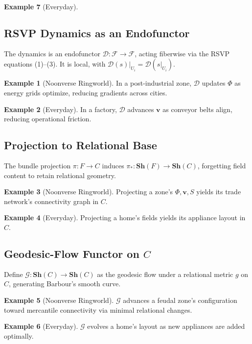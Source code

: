 \documentclass[11pt]{article}
\theoremstyle{plain}
\theoremstyle{definition}
\newtheorem{example}{Example}[section]
\begin{document}
\begin{example}[Everyday]
\subsection{RSVP Dynamics as an Endofunctor}
The dynamics is an endofunctor $\mathcal{D}: \mathscr{F} \to \mathscr{F}$, acting fiberwise via the RSVP equations (1)--(3). It is local, with $\mathcal{D}(s)|_{U_i} = \mathcal{D}(s|_{U_i})$.

\begin{example}[Noonverse Ringworld]
In a post-industrial zone, $\mathcal{D}$ updates $\Phi$ as energy grids optimize, reducing gradients across cities.
\end{example}

\begin{example}[Everyday]
In a factory, $\mathcal{D}$ advances $\mathbf{v}$ as conveyor belts align, reducing operational friction.
\end{example}

\subsection{Projection to Relational Base}
The bundle projection $\pi: F \to C$ induces $\pi_*: \mathbf{Sh}(F) \to \mathbf{Sh}(C)$, forgetting field content to retain relational geometry.

\begin{example}[Noonverse Ringworld]
Projecting a zone’s $\Phi, \mathbf{v}, S$ yields its trade network’s connectivity graph in $C$.
\end{example}

\begin{example}[Everyday]
Projecting a home’s fields yields its appliance layout in $C$.
\end{example}

\subsection{Geodesic-Flow Functor on $C$}
Define $\mathcal{G}: \mathbf{Sh}(C) \to \mathbf{Sh}(C)$ as the geodesic flow under a relational metric $g$ on $C$, generating Barbour’s smooth curve.

\begin{example}[Noonverse Ringworld]
$\mathcal{G}$ advances a feudal zone’s configuration toward mercantile connectivity via minimal relational changes.
\end{example}

\begin{example}[Everyday]
$\mathcal{G}$ evolves a home’s layout as new appliances are added optimally.
\end{example}


\end{example}
\end{document}
